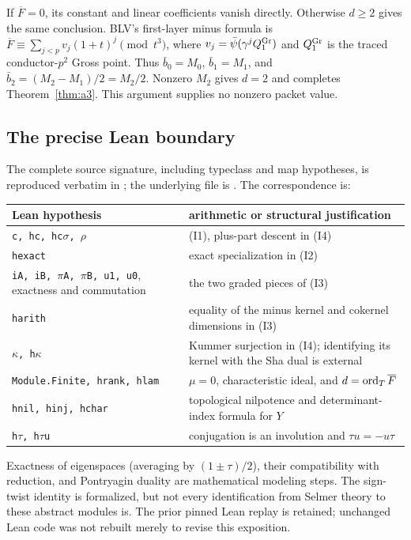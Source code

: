 If $\overline F=0$, its constant and linear coefficients vanish directly. Otherwise $d\ge2$ gives the same conclusion. BLV's first-layer minus formula is
$\overline F\equiv\sum_{j<p}v_j(1+t)^j\pmod{t^3}$, where
$v_j=\bar\psi(\gamma^jQ^{\rm Gr}_1)$ and $Q^{\rm Gr}_1$ is the traced conductor-$p^2$ Gross point. Thus
$\bar b_0=M_0$, $\bar b_1=M_1$, and $\bar b_2=(M_2-M_1)/2=M_2/2$.
Nonzero $M_2$ gives $d=2$ and completes Theorem~\ref{thm:a3}. This argument supplies no nonzero packet value.

\subsection{The precise Lean boundary}
The complete source signature, including typeclass and map hypotheses, is reproduced verbatim in
; the underlying file is
.
The correspondence is:
\begin{center}\begin{tabular}{@{}p{}p{}@{}}\toprule
Lean hypothesis & arithmetic or structural justification\\\midrule
\texttt{c, hc, hc$\sigma$, $\rho$} & (I1), plus-part descent in (I4)\\
\texttt{hexact} & exact specialization in (I2)\\
\texttt{iA, iB, $\pi$A, $\pi$B, u1, u0}, exactness and commutation & the two graded pieces of (I3)\\
\texttt{harith} & equality of the minus kernel and cokernel dimensions in (I3)\\
\texttt{$\kappa$, h$\kappa$} & Kummer surjection in (I4); identifying its kernel with the Sha dual is external\\
\texttt{Module.Finite, hrank, hlam} & $\mu=0$, characteristic ideal, and $d=\operatorname{ord}_T\overline F$\\
\texttt{hnil, hinj, hchar} & topological nilpotence and determinant-index formula for $Y$\\
\texttt{h$\tau$, h$\tau$u} & conjugation is an involution and $\tau u=-u\tau$\\\bottomrule
\end{tabular}\end{center}
Exactness of eigenspaces (averaging by $(1\pm\tau)/2$), their compatibility with reduction, and Pontryagin duality are mathematical modeling steps. The sign-twist identity is formalized, but not every identification from Selmer theory to these abstract modules is. The prior pinned Lean replay is retained; unchanged Lean code was not rebuilt merely to revise this exposition.
